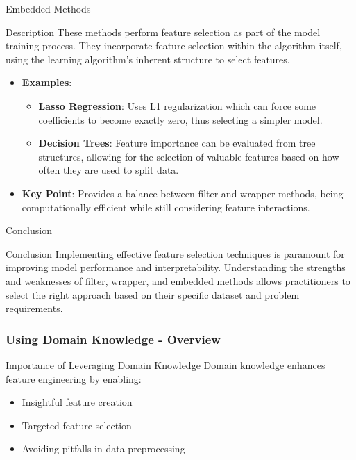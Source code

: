 \documentclass[aspectratio=169]{beamer}
\begin{document}
\begin{frame}[fragile]{Embedded Methods}
    \begin{block}{Description}
        These methods perform feature selection as part of the model training process. 
        They incorporate feature selection within the algorithm itself, using the learning algorithm’s inherent structure to select features.
    \end{block}

    \begin{itemize}
        \item \textbf{Examples}:
            \begin{itemize}
                \item \textbf{Lasso Regression}: Uses L1 regularization which can force some coefficients to become exactly zero, thus selecting a simpler model.
                \item \textbf{Decision Trees}: Feature importance can be evaluated from tree structures, allowing for the selection of valuable features based on how often they are used to split data.
            \end{itemize}
        \item \textbf{Key Point}: Provides a balance between filter and wrapper methods, being computationally efficient while still considering feature interactions.
    \end{itemize}
\end{frame}

\begin{frame}[fragile]{Conclusion}
    \begin{block}{Conclusion}
        Implementing effective feature selection techniques is paramount for improving model performance and interpretability. 
        Understanding the strengths and weaknesses of filter, wrapper, and embedded methods allows practitioners to select the right approach based on their specific dataset and problem requirements.
    \end{block}
\end{frame}

\begin{frame}[fragile]
    \frametitle{Using Domain Knowledge - Overview}
    \begin{block}{Importance of Leveraging Domain Knowledge}
        Domain knowledge enhances feature engineering by enabling:
        \begin{itemize}
            \item Insightful feature creation
            \item Targeted feature selection
            \item Avoiding pitfalls in data preprocessing
        \end{itemize}
    \end{block}
\end{frame}
\end{document}
